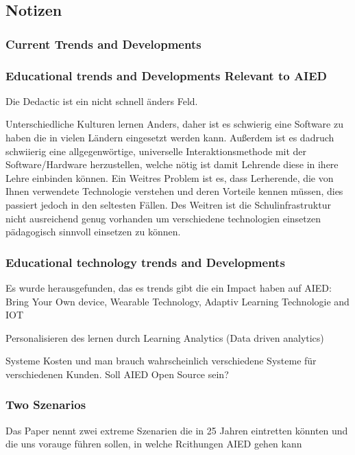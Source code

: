 \subsection{Notizen}

\subsubsection*{Current Trends and Developments}

\subsubsection{Educational trends and Developments Relevant to AIED}
Die Dedactic ist ein nicht schnell änders Feld.

Unterschiedliche Kulturen lernen Anders, daher ist es schwierig eine Software zu haben die in vielen Ländern eingesetzt werden kann.
Außerdem ist es dadruch schwiierig eine allgegenwörtige, universelle Interaktionsmethode mit der Software/Hardware herzustellen,
welche nötig ist damit Lehrende diese in ihere Lehre einbinden können. 
Ein Weitres Problem ist es, dass Lerherende, die von Ihnen verwendete Technologie verstehen und deren Vorteile kennen müssen,
dies passiert jedoch in den seltesten Fällen. Des Weitren ist die Schulinfrastruktur nicht ausreichend genug vorhanden um verschiedene technologien einsetzen pädagogisch sinnvoll einsetzen zu können.


\subsubsection{Educational technology trends and Developments}
Es wurde herausgefunden, das es trends gibt die ein Impact haben auf AIED: Bring Your Own device, Wearable Technology, Adaptiv Learning Technologie and IOT

Personalisieren des lernen durch Learning Analytics (Data driven analytics)

Systeme Kosten und man brauch wahrscheinlich verschiedene Systeme für verschiedenen Kunden. Soll AIED Open Source sein?




\subsubsection{Two Szenarios}
Das Paper nennt zwei extreme Szenarien die in 25 Jahren eintretten könnten und die uns vorauge führen sollen, in welche Rcithungen AIED gehen kann

